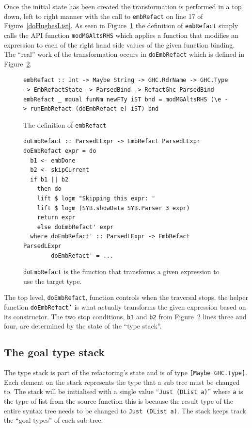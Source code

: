 Once the initial state has been created the transformation is performed in a top down, left to right manner with the call to \texttt{embRefact} on line 17 of Figure~\ref{doHughesList}. As seen in Figure~\ref{embRefact} the definition of \texttt{embRefact} simply calls the API function \texttt{modMGAltsRHS} which applies a function that modifies an expression to each of the right hand side values of the given function binding. The ``real'' work of the transformation occurs in \texttt{doEmbRefact} which is defined in Figure~\ref{doEmbRefact}.

\begin{figure}[t]
\begin{lstlisting}
embRefact :: Int -> Maybe String -> GHC.RdrName -> GHC.Type -> EmbRefactState -> ParsedBind -> RefactGhc ParsedBind
embRefact _ mqual funNm newFTy iST bnd = modMGAltsRHS (\e -> runEmbRefact (doEmbRefact e) iST) bnd
\end{lstlisting}
\caption{The definition of \texttt{embRefact}}
\label{embRefact}
\end{figure}

\begin{figure}[t]
\begin{lstlisting}
doEmbRefact :: ParsedLExpr -> EmbRefact ParsedLExpr
doEmbRefact expr = do
  b1 <- embDone
  b2 <- skipCurrent
  if b1 || b2
    then do
    lift $ logm "Skipping this expr: "
    lift $ logm (SYB.showData SYB.Parser 3 expr)
    return expr
    else doEmbRefact' expr
  where doEmbRefact' :: ParsedLExpr -> EmbRefact ParsedLExpr
  		doEmbRefact' = ...
\end{lstlisting}
\caption{\texttt{doEmbRefact} is the function that transforms a given expression to use the target type.}
\label{doEmbRefact}
\end{figure}

The top level, \texttt{doEmbRefact}, function controls when the traversal stops, the helper function \texttt{doEmbRefact'} is what actually transforms the given expression based on its constructor. The two stop conditions, \texttt{b1} and \texttt{b2} from Figure~\ref{doEmbRefact} lines three and four, are determined by the state of the ``type stack''.

\subsection{The goal type stack}
\label{typeStack}

The type stack is part of the refactoring's state and is of type \texttt{[Maybe GHC.Type]}. Each element on the stack represents the type that a sub tree must be changed to. The stack will be initialised with a single value ``\texttt{Just (DList a)}'' where \texttt{a} is the type of list from the source function this is because the result type of the entire syntax tree needs to be changed to \texttt{Just (DList a)}. The stack keeps track the ``goal types'' of each sub-tree. 

